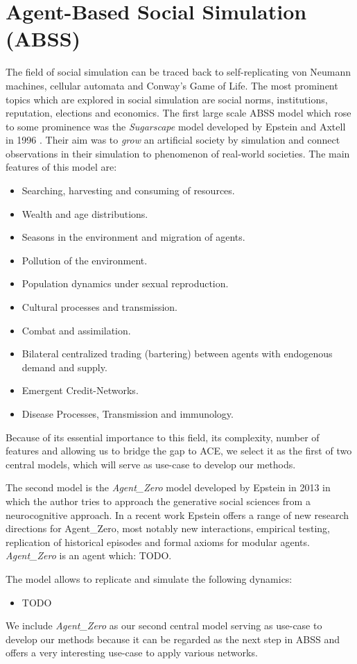 \section{Agent-Based Social Simulation (ABSS)}
The field of social simulation can be traced back to self-replicating von Neumann machines, cellular automata and Conway's Game of Life. The most prominent topics which are explored in social simulation are social norms, institutions, reputation, elections and economics. The first large scale ABSS model which rose to some prominence was the \textit{Sugarscape} model developed by Epstein and Axtell in 1996 \cite{epstein_growing_1996}. Their aim was to \textit{grow} an artificial society by simulation and connect observations in their simulation to phenomenon of real-world societies. The main features of this model are:

\begin{itemize}
	\item Searching, harvesting and consuming of resources.
	\item Wealth and age distributions.
	\item Seasons in the environment and migration of agents.
	\item Pollution of the environment.
	\item Population dynamics under sexual reproduction.
	\item Cultural processes and transmission.
	\item Combat and assimilation.
	\item Bilateral centralized trading (bartering) between agents with endogenous demand and supply.
	\item Emergent Credit-Networks.
	\item Disease Processes, Transmission and immunology.
\end{itemize}

Because of its essential importance to this field, its complexity, number of features and allowing us to bridge the gap to ACE, we select it as the first of two central models, which will serve as use-case to develop our methods.

The second model is the \textit{Agent\_Zero} model developed by Epstein in 2013 \cite{epstein_agent_zero:_2014} in which the author tries to approach the generative social sciences from a neurocognitive approach. In a recent work \cite{epstein_advancing_2016} Epstein offers a range of new research directions for Agent\_Zero, most notably new interactions, empirical testing, replication of historical episodes and formal axioms for modular agents. 
\textit{Agent\_Zero} is an agent which: TODO. 

The model allows to replicate and simulate the following dynamics:

\begin{itemize}
	\item TODO
\end{itemize}

We include \textit{Agent\_Zero} as our second central model serving as use-case to develop our methods because it can be regarded as the next step in ABSS and offers a very interesting use-case to apply various networks.